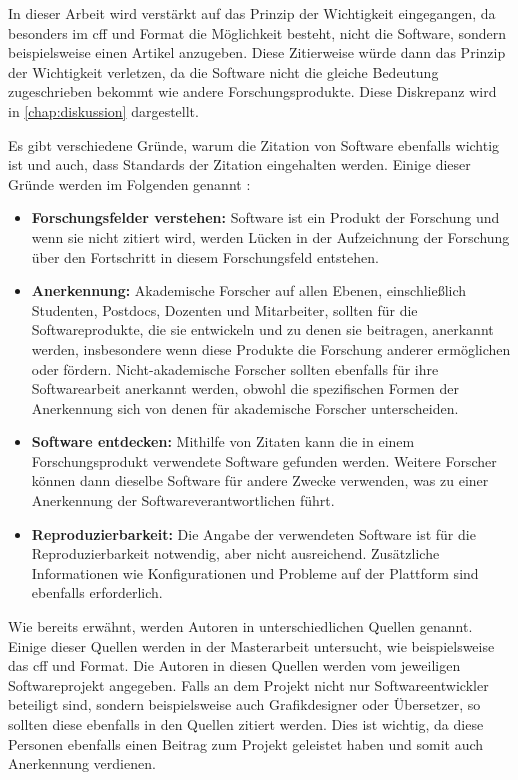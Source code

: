 In dieser Arbeit wird verstärkt auf das Prinzip der Wichtigkeit eingegangen, da besonders im \gls{cff} und  Format die Möglichkeit besteht, nicht die Software, sondern beispielsweise einen Artikel anzugeben.
Diese Zitierweise würde dann das Prinzip der Wichtigkeit verletzen, da die Software nicht die gleiche Bedeutung zugeschrieben bekommt wie andere Forschungsprodukte.
Diese Diskrepanz wird in \autoref{chap:diskussion} dargestellt.

Es gibt verschiedene Gründe, warum die Zitation von Software ebenfalls wichtig ist und auch, dass Standards der Zitation eingehalten werden.
Einige dieser Gründe werden im Folgenden genannt \autocite{smith_software_2016}:

\begin{itemize}
    \item \textbf{Forschungsfelder verstehen:} Software ist ein Produkt der Forschung und wenn sie nicht zitiert wird, werden Lücken in der Aufzeichnung der Forschung über den Fortschritt in diesem Forschungsfeld entstehen.
    \item \textbf{Anerkennung:} Akademische Forscher auf allen Ebenen, einschließlich Studenten, Postdocs, Dozenten und Mitarbeiter, sollten für die Softwareprodukte, die sie entwickeln und zu denen sie beitragen, anerkannt werden, insbesondere wenn diese Produkte die Forschung anderer ermöglichen oder fördern. Nicht-akademische Forscher sollten ebenfalls für ihre Softwarearbeit anerkannt werden, obwohl die spezifischen Formen der Anerkennung sich von denen für akademische Forscher unterscheiden.
    \item \textbf{Software entdecken:} Mithilfe von Zitaten kann die in einem Forschungsprodukt verwendete Software gefunden werden. Weitere Forscher können dann dieselbe Software für andere Zwecke verwenden, was zu einer Anerkennung der Softwareverantwortlichen führt.
    \item \textbf{Reproduzierbarkeit:} Die Angabe der verwendeten Software ist für die Reproduzierbarkeit notwendig, aber nicht ausreichend. Zusätzliche Informationen wie Konfigurationen und Probleme auf der Plattform sind ebenfalls erforderlich.
\end{itemize}

Wie bereits erwähnt, werden Autoren in unterschiedlichen Quellen genannt.
Einige dieser Quellen werden in der Masterarbeit untersucht, wie beispielsweise das \gls{cff} und  Format.
Die Autoren in diesen Quellen werden vom jeweiligen Softwareprojekt angegeben.
Falls an dem Projekt nicht nur Softwareentwickler beteiligt sind, sondern beispielsweise auch Grafikdesigner oder Übersetzer, so sollten diese ebenfalls in den Quellen zitiert werden.
Dies ist wichtig, da diese Personen ebenfalls einen Beitrag zum Projekt geleistet haben und somit auch Anerkennung verdienen.

